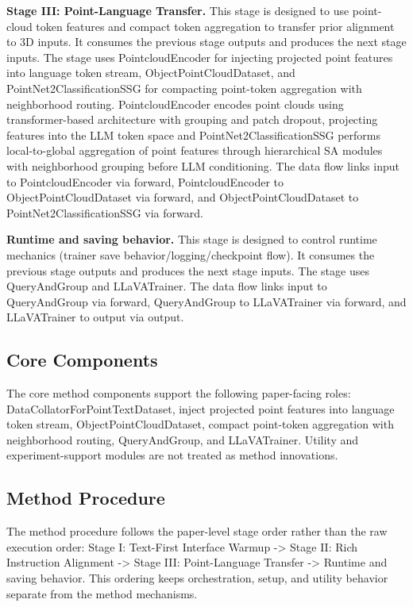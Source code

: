 \textbf{Stage III: Point-Language Transfer.} This stage is designed to use point-cloud token features and compact token aggregation to transfer prior alignment to 3D inputs. It consumes the previous stage outputs and produces the next stage inputs. The stage uses PointcloudEncoder for injecting projected point features into language token stream, ObjectPointCloudDataset, and PointNet2ClassificationSSG for compacting point-token aggregation with neighborhood routing. PointcloudEncoder encodes point clouds using transformer-based architecture with grouping and patch dropout, projecting features into the LLM token space and PointNet2ClassificationSSG performs local-to-global aggregation of point features through hierarchical SA modules with neighborhood grouping before LLM conditioning. The data flow links input to PointcloudEncoder via forward, PointcloudEncoder to ObjectPointCloudDataset via forward, and ObjectPointCloudDataset to PointNet2ClassificationSSG via forward.

\textbf{Runtime and saving behavior.} This stage is designed to control runtime mechanics (trainer save behavior/logging/checkpoint flow). It consumes the previous stage outputs and produces the next stage inputs. The stage uses QueryAndGroup and LLaVATrainer. The data flow links input to QueryAndGroup via forward, QueryAndGroup to LLaVATrainer via forward, and LLaVATrainer to output via output.

\subsection{Core Components}
The core method components support the following paper-facing roles: DataCollatorForPointTextDataset, inject projected point features into language token stream, ObjectPointCloudDataset, compact point-token aggregation with neighborhood routing, QueryAndGroup, and LLaVATrainer. Utility and experiment-support modules are not treated as method innovations.

\subsection{Method Procedure}
The method procedure follows the paper-level stage order rather than the raw execution order: Stage I: Text-First Interface Warmup -> Stage II: Rich Instruction Alignment -> Stage III: Point-Language Transfer -> Runtime and saving behavior. This ordering keeps orchestration, setup, and utility behavior separate from the method mechanisms.

